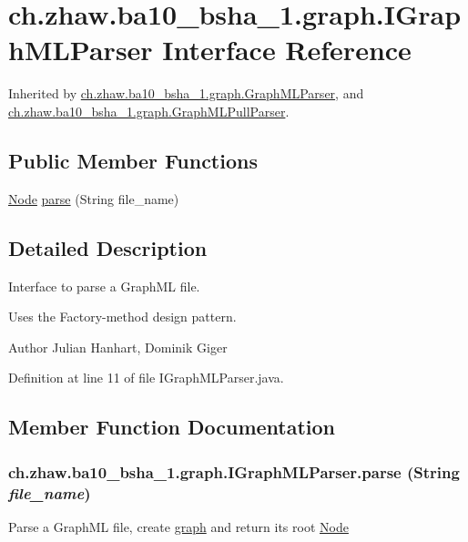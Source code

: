 \hypertarget{interfacech_1_1zhaw_1_1ba10__bsha__1_1_1graph_1_1IGraphMLParser}{
\section{ch.zhaw.ba10\_\-bsha\_\-1.graph.IGraphMLParser Interface Reference}
\label{interfacech_1_1zhaw_1_1ba10__bsha__1_1_1graph_1_1IGraphMLParser}
}


Inherited by \hyperlink{classch_1_1zhaw_1_1ba10__bsha__1_1_1graph_1_1GraphMLParser}{ch.zhaw.ba10\_\-bsha\_\-1.graph.GraphMLParser}, and \hyperlink{classch_1_1zhaw_1_1ba10__bsha__1_1_1graph_1_1GraphMLPullParser}{ch.zhaw.ba10\_\-bsha\_\-1.graph.GraphMLPullParser}.\subsection*{Public Member Functions}
\begin{DoxyCompactItemize}
\item 
\hyperlink{classch_1_1zhaw_1_1ba10__bsha__1_1_1graph_1_1Node}{Node} \hyperlink{interfacech_1_1zhaw_1_1ba10__bsha__1_1_1graph_1_1IGraphMLParser_a4b7516793ccd484abfe8ab83f4e57fa8}{parse} (String file\_\-name)
\end{DoxyCompactItemize}


\subsection{Detailed Description}
Interface to parse a GraphML file.

Uses the Factory-\/method design pattern.

\begin{DoxyAuthor}{Author}
Julian Hanhart, Dominik Giger 
\end{DoxyAuthor}


Definition at line 11 of file IGraphMLParser.java.

\subsection{Member Function Documentation}
\hypertarget{interfacech_1_1zhaw_1_1ba10__bsha__1_1_1graph_1_1IGraphMLParser_a4b7516793ccd484abfe8ab83f4e57fa8}{
\subsubsection[{parse}]{ ch.zhaw.ba10\_\-bsha\_\-1.graph.IGraphMLParser.parse (String {\em file\_\-name})}}
\label{interfacech_1_1zhaw_1_1ba10__bsha__1_1_1graph_1_1IGraphMLParser_a4b7516793ccd484abfe8ab83f4e57fa8}
Parse a GraphML file, create \hyperlink{namespacech_1_1zhaw_1_1ba10__bsha__1_1_1graph}{graph} and return its root \hyperlink{classch_1_1zhaw_1_1ba10__bsha__1_1_1graph_1_1Node}{Node}

